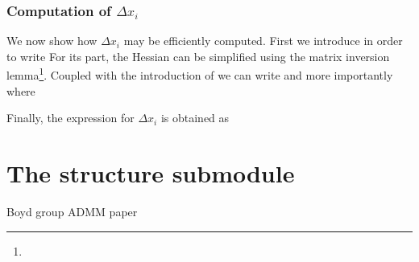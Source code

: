 \documentclass{book}
\begin{document}
\subsubsection{Computation of $\Delta x_i$}
We now show how $\Delta x_i$ may be efficiently computed.
First we introduce
    in order to write
For its part, the Hessian can be simplified using the matrix inversion lemma\footnote{}.
Coupled with the introduction of 
    we can write
    and more importantly
    where
 
Finally, the expression for $\Delta x_i$ is obtained as
        
    
\section{The structure submodule}


\begin{thebibliography}{99}
 Boyd group ADMM paper
\end{thebibliography}
\end{document}

